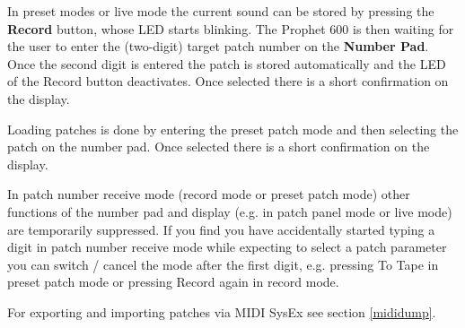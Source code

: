 In preset modes or live mode the current sound can be stored by pressing the \textbf{Record} button, whose LED starts blinking. The Prophet 600 is then waiting for the user to enter the (two-digit) target patch number on the \textbf{Number Pad}. Once the second digit is entered the patch is stored automatically and the LED of the Record button deactivates. Once selected there is a short confirmation on the display.  

Loading patches is done by entering the preset patch mode and then selecting the patch on the number pad. Once selected there is a short confirmation on the display.

In patch number receive mode (record mode or preset patch mode) other functions of the number pad and display (e.g. in patch panel mode or live mode) are temporarily suppressed. If you find you have accidentally started typing a digit in patch number receive mode while expecting to select a patch parameter you can switch / cancel the mode after the first digit, e.g. pressing To Tape in preset patch mode or pressing Record again in record mode.

For exporting and importing patches via MIDI SysEx see section \ref{mididump}.
